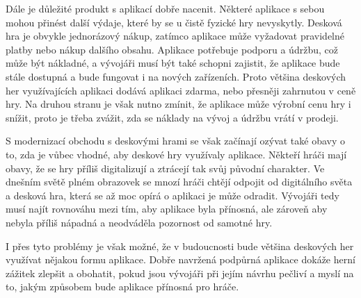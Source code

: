Dále je důležité produkt s aplikací dobře nacenit. Některé aplikace s sebou mohou přinést další výdaje, které by se u čistě fyzické hry nevyskytly. Desková hra je obvykle jednorázový nákup, zatímco aplikace může vyžadovat pravidelné platby nebo nákup dalšího obsahu. Aplikace potřebuje podporu a údržbu, což může být nákladné, a vývojáři musí být také schopni zajistit, že aplikace bude stále dostupná a bude fungovat i na nových zařízeních. Proto většina deskových her využívajících aplikaci dodává aplikaci zdarma, nebo přesněji zahrnutou v ceně hry. Na druhou stranu je však nutno zmínit, že aplikace může výrobní cenu hry i snížit, proto je třeba zvážit, zda se náklady na vývoj a údržbu vrátí v prodeji.

S modernizací obchodu s deskovými hrami se však začínají ozývat také obavy o to, zda je vůbec vhodné, aby deskové hry využívaly aplikace. Někteří hráči mají obavy, že se hry příliš digitalizují a ztrácejí tak svůj původní charakter. Ve dnešním světě plném obrazovek se mnozí hráči chtějí odpojit od digitálního světa a desková hra, která se až moc opírá o aplikaci je může odradit. Vývojáři tedy musí najít rovnováhu mezi tím, aby aplikace byla přínosná, ale zároveň aby nebyla příliš nápadná a neodváděla pozornost od samotné hry.

I přes tyto problémy je však možné, že v budoucnosti bude většina deskových her využívat nějakou formu aplikace. Dobře navržená podpůrná aplikace dokáže herní zážitek zlepšit a obohatit, pokud jsou vývojáři při jejím návrhu pečliví a myslí na to, jakým způsobem bude aplikace přínosná pro hráče.